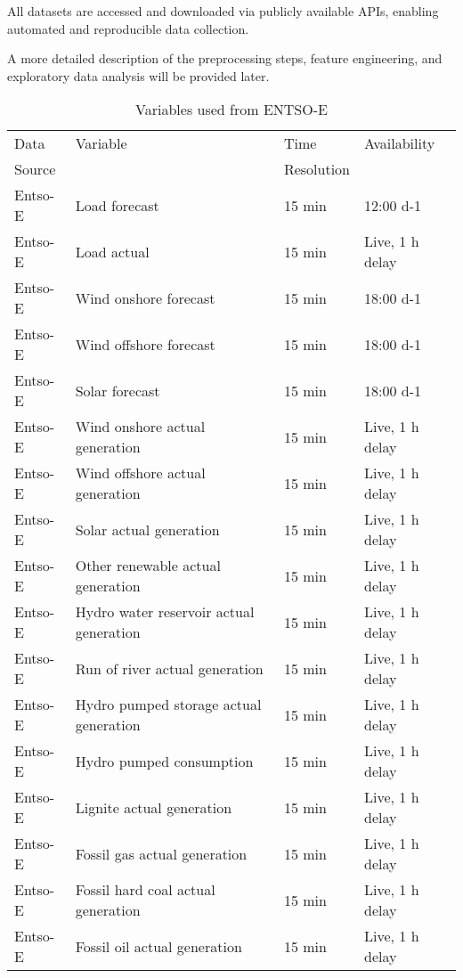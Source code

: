 \documentclass[class=scrbook, crop=false]{standalone}
\begin{document}

All datasets are accessed and downloaded via publicly available APIs, enabling automated and reproducible data collection.

A more detailed description of the preprocessing steps, feature engineering, and exploratory data analysis will be provided later.


\begin{table}[h]
\centering
\begin{tabular}{l|l|l|l}
 Data  & Variable &  Time  & Availability  \\
 Source&&Resolution&\\\hline
 Entso-E & Load forecast & 15 min  & 12:00 d-1 \\
 Entso-E & Load actual & 15 min  &Live, 1 h delay \\
 Entso-E & Wind onshore forecast & 15 min  & 18:00 d-1\\
 Entso-E & Wind offshore forecast & 15 min & 18:00 d-1 \\
 Entso-E & Solar forecast & 15 min & 18:00 d-1 \\
 Entso-E & Wind onshore actual generation & 15 min  &Live, 1 h delay\\
 Entso-E & Wind offshore actual generation & 15 min &Live, 1 h delay \\
 Entso-E & Solar actual generation & 15 min & Live, 1 h delay \\
 Entso-E & Other renewable actual generation & 15 min &Live, 1 h delay \\
 Entso-E & Hydro water reservoir actual generation & 15 min & Live, 1 h delay \\
 Entso-E & Run of river actual generation & 15 min &Live, 1 h delay \\
 Entso-E & Hydro pumped storage actual generation & 15 min & Live, 1 h delay \\
 Entso-E & Hydro pumped consumption & 15 min & Live, 1 h delay \\
 Entso-E & Lignite actual generation & 15 min & Live, 1 h delay \\
 Entso-E & Fossil gas actual generation & 15 min & Live, 1 h delay \\
 Entso-E & Fossil hard coal actual generation & 15 min & Live, 1 h delay \\
 Entso-E & Fossil oil actual generation & 15 min & Live, 1 h delay \\
  
\end{tabular}
\caption{Variables used from ENTSO-E}
\label{Table::Energy_Data_Entsoe}
\end{table}
\end{document}
